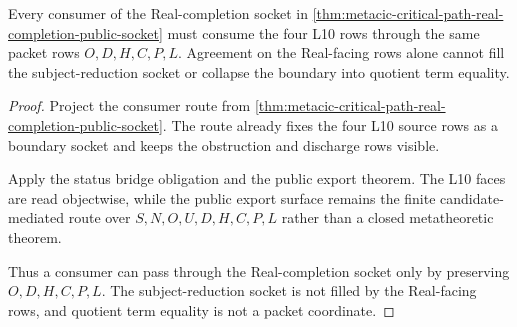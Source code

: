 \begin{theorem}
\label{thm:metacic-critical-path-l10-boundary-consumer}
Every consumer of the Real-completion socket in \autoref{thm:metacic-critical-path-real-completion-public-socket} must consume the four L10 rows through the same packet rows $O,D,H,C,P,L$. Agreement on the Real-facing rows alone cannot fill the subject-reduction socket or collapse the boundary into quotient term equality.
\end{theorem}
\begin{proof}
Project the consumer route from \autoref{thm:metacic-critical-path-real-completion-public-socket}. The route already fixes the four L10 source rows as a boundary socket and keeps the obstruction and discharge rows visible.

Apply the status bridge obligation and the public export theorem. The L10 faces are read objectwise, while the public export surface remains the finite candidate-mediated route over $S,N,O,U,D,H,C,P,L$ rather than a closed metatheoretic theorem.

Thus a consumer can pass through the Real-completion socket only by preserving $O,D,H,C,P,L$. The subject-reduction socket is not filled by the Real-facing rows, and quotient term equality is not a packet coordinate.
\end{proof}

